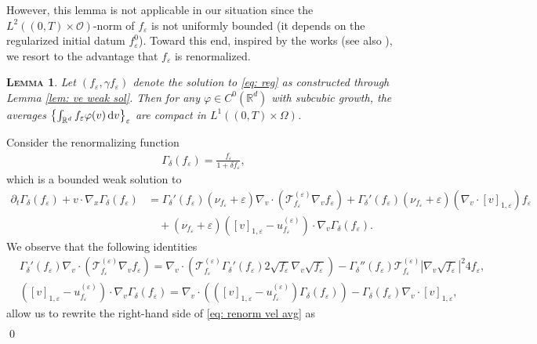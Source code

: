 \documentclass[10pt, reqno]{amsart}
\theoremstyle{plain}
\newtheorem{lemma}[theorem]{\normalfont \scshape Lemma}
\theoremstyle{definition}
\theoremstyle{remark}
\renewenvironment{proof}[1][\proofname]{\noindent{\scshape #1.\quad}}{\qed}
\numberwithin{equation}{section}
\newcommand{\calO}{\mathcal O}
\newcommand{\calT}{\mathcal T}
\newcommand{\p}{\partial}
\newcommand{\R}{\mathbb{R}}
\newcommand{\ve}{\varepsilon}
\newcommand{\dv}{\textnormal{d}v}
\newcommand{\lt}{\left}
\newcommand{\rt}{\right}
\newcommand{\intr}{\int_{\R^d}}
\newcommand{\renorm}[3]{\lt[#1\rt]_{#2 , #3}}
\begin{document}
However, this lemma is not applicable in our situation since the $L^2((0,T)\times \calO)$-norm of $f_\ve$ is not uniformly bounded (it depends on the regularized initial datum $f_\ve^0$). Toward this end, inspired by the works \cite{dipernalionsMaxwell1989, DipernaLions89Annals, GolseSaintRaymond05} (see also \cite{Masmoudi10}), we resort to the advantage that $f_\ve$ is renormalized.

\begin{lemma} \label{lem: subcubic}
    Let $(f_\ve,\gamma f_\ve)$ denote the solution to \eqref{eq: reg} as constructed through Lemma \ref{lem: ve weak sol}. Then for any $\varphi\in C^0(\R^d)$ with subcubic growth, the averages $\lt\{\intr f_\ve \varphi(v)\,\dv\rt\}_\ve$ are compact in $L^1((0,T)\times\Omega)$.
\end{lemma}
\begin{proof}
Consider the renormalizing function
\begin{align*}
    \Gamma_\delta(f_\ve) = \frac{f_\ve}{1 + \delta f_\ve},
\end{align*}
which is a bounded weak solution to
\begin{equation}\label{eq: renorm vel avg}
\begin{split}
    \p_t \Gamma_\delta(f_\ve) + v\cdot \nabla_x \Gamma_\delta(f_\ve) &= \Gamma_\delta'(f_\ve) (\nu_{f_\ve} + \ve) \nabla_v \cdot \lt( \calT_{f_\ve}^{(\ve)} \nabla_v f_\ve \rt)   + \Gamma_\delta'(f_\ve) (\nu_{f_\ve} + \ve) \lt( \nabla_v\cdot \renorm{v}{1}{\ve} \rt) f_\ve \\
    &\quad + (\nu_{f_\ve} + \ve) (\renorm{v}{1}{\ve} - u_{f_\ve}^{(\ve)}) \cdot \nabla_v \Gamma_\delta(f_\ve) .
\end{split}
\end{equation}
We observe that the following identities
\begin{align*}
    &\Gamma_\delta'(f_\ve) \nabla_v\cdot \lt( \calT_{f_\ve}^{(\ve)} \nabla_v f_\ve \rt)  = \nabla_v \cdot \lt( \calT_{f_\ve}^{(\ve)} \Gamma_\delta'(f_\ve) 2\sqrt{f_\ve} \nabla_v \sqrt{f_\ve} \rt) - \Gamma_\delta''(f_\ve) \calT_{f_\ve}^{(\ve)} |\nabla_v \sqrt{f_\ve}|^2 4f_\ve ,\\
    &(\renorm{v}{1}{\ve}-u_{f_\ve}^{(\ve)}) \cdot \nabla_v \Gamma_\delta(f_\ve) = \nabla_v\cdot \lt( (\renorm{v}{1}{\ve}-u_{f_\ve}^{(\ve)}) \Gamma_\delta(f_\ve) \rt) - \Gamma_\delta(f_\ve) \nabla_v\cdot \renorm{v}{1}{\ve}, 
\end{align*}
allow us to rewrite the right-hand side of \eqref{eq: renorm vel avg} as
\begin{align*}

\end{align*}
\end{proof}
\end{document}
